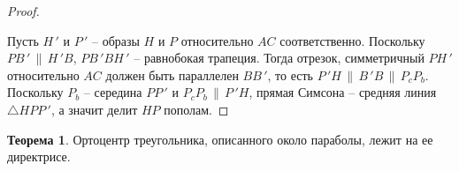 \documentclass[12pt]{article}
\theoremstyle{definition}
\newtheorem{theorem}{Теорема}[section]
\begin{document}
\begin{proof}
\begin{center}
        \end{center}
        Пусть $H\,'$ и $P\,'$ -- образы $H$ и $P$ относительно $AC$ соответственно. Поскольку $PB\,'\,\|\,H\,'B$, $PB\,'BH\,'$ -- равнобокая трапеция. Тогда отрезок, симметричный $PH\,'$ относительно $AC$ должен быть параллелен $BB\,'$, то есть $P\,'H\,\|\,B\,'B\,\|\,P_cP_b$. Поскольку $P_b$ -- середина $PP\,'$ и $P_cP_b\,\|\,P\,'H$, прямая Симсона -- средняя линия $\triangle HPP\,'$, а значит делит $HP$ пополам.
    \end{proof}
    \begin{theorem}
        Ортоцентр треугольника, описанного около параболы, лежит на ее директрисе.
    \end{theorem}
\end{document}
